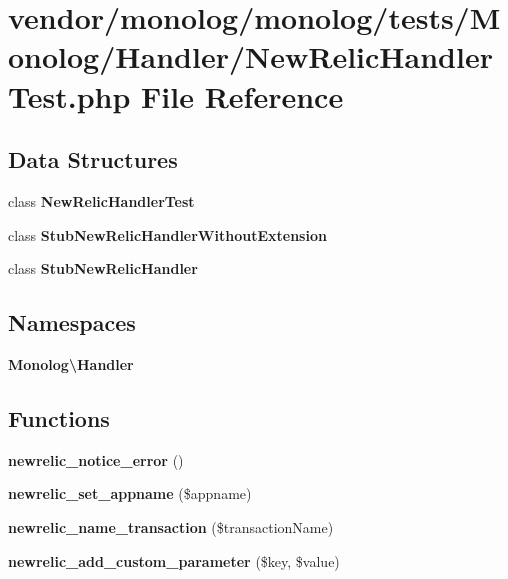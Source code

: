 \section{vendor/monolog/monolog/tests/\+Monolog/\+Handler/\+New\+Relic\+Handler\+Test.php File Reference}
\label{_new_relic_handler_test_8php}
\subsection*{Data Structures}
\begin{DoxyCompactItemize}
\item 
class {\bf New\+Relic\+Handler\+Test}
\item 
class {\bf Stub\+New\+Relic\+Handler\+Without\+Extension}
\item 
class {\bf Stub\+New\+Relic\+Handler}
\end{DoxyCompactItemize}
\subsection*{Namespaces}
\begin{DoxyCompactItemize}
\item 
 {\bf Monolog\textbackslash{}\+Handler}
\end{DoxyCompactItemize}
\subsection*{Functions}
\begin{DoxyCompactItemize}
\item 
{\bf newrelic\+\_\+notice\+\_\+error} ()
\item 
{\bf newrelic\+\_\+set\+\_\+appname} (\$appname)
\item 
{\bf newrelic\+\_\+name\+\_\+transaction} (\$transaction\+Name)
\item 
{\bf newrelic\+\_\+add\+\_\+custom\+\_\+parameter} (\$key, \$value)
\end{DoxyCompactItemize}
